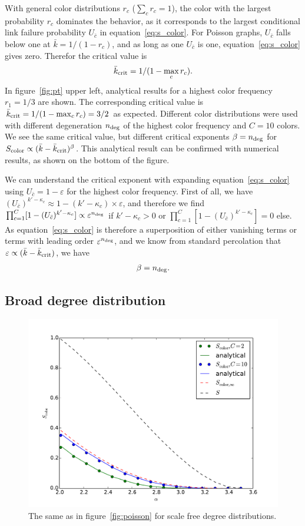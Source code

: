\documentclass[aps, pre, onecolumn, a4paper, floatfix]{revtex4}
\begin{document}
With general color distributions $r_c$ ($\sum_c r_c =1$), the color with the largest probability 
$r_c$ dominates 
the behavior, as it corresponds to the largest conditional link failure probability $U_{\bar c}$
in equation~\ref{eq:s_color}. For Poisson graphs, $U_{\bar c}$ 
falls below one at ${\bar k}=1/(1-r_c)$, and as long as one $U_{\bar c}$ is one, equation~\ref{eq:s_color}
gives zero. Therefor the critical value is 
\begin{align}
{\bar k}_{\rm crit}=1/(1-\max_c r_c).
\end{align}
In figure~\ref{fig:pt} upper left, analytical results for a highest color frequency $r_1=1/3$ are shown. 
The corresponding critical value is ${\bar k}_{\rm crit}=1/(1-\max_c r_c)=3/2$ as expected. 
Different color distributions were used with different degeneration $n_{\rm deg}$ of the highest color 
frequency and $C=10$ colors. We see the same critical value, but different critical exponents $\beta = n_{\rm deg}$ for 
$S_{\rm color} \propto ({\bar k}-{\bar k}_{\rm crit})^{\beta}$.
This analytical result can be confirmed with numerical results, as shown on the bottom of the figure. 

We can understand the critical exponent with expanding equation~\ref{eq:s_color} using 
$U_{\bar c}=1-\varepsilon$ for the highest color frequency. First of all, we have 
$(U_{\bar c})^{k'-\kappa_c}\approx 1-(k'-\kappa_c)\times \varepsilon$, and therefore we find 
$\prod_{c=1}^C [1-(U_{\bar c})^{k'-\kappa_c}]\propto \varepsilon^{n_{\rm deg}}$ if $k'-\kappa_c>0$ or 
$\prod_{c=1}^C [1-(U_{\bar c})^{k'-\kappa_c}]=0$ else. As
equation~\ref{eq:s_color} is therefore a superposition of either vanishing terms or terms with 
leading order $\varepsilon^{n_{\rm deg}}$, and we know from standard percolation that 
$\varepsilon\propto ({\bar k}-{\bar k}_{\rm crit})$, we have 
\begin{align}
\beta=n_{\rm deg}.
\end{align}

\clearpage


\subsection{Broad degree distribution}

\begin{figure}[htb]
\begin{center}
    \includegraphics[width=0.6\columnwidth]{S_color_broad.pdf}
    \caption{The same as in figure~\ref{fig:poisson} for scale free degree distributions. }
    \label{fig:broad}
\end{center}
\end{figure}
\end{document}
